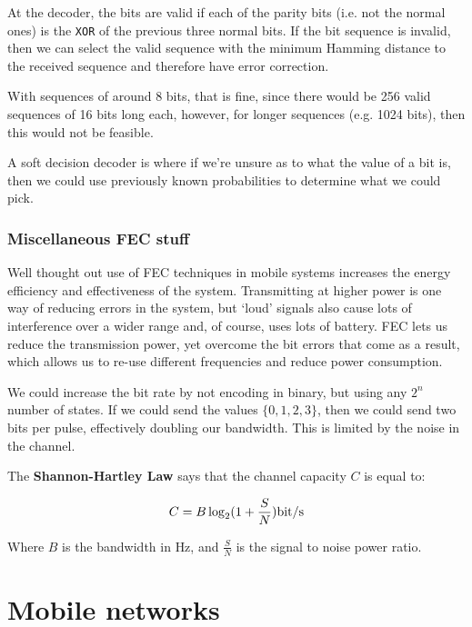 At the decoder, the bits are valid if each of the parity bits (i.e. not the
normal ones) is the \texttt{XOR} of the previous three normal bits. If the bit
sequence is invalid, then we can select the valid sequence with the minimum
Hamming distance to the received sequence and therefore have error correction.

With sequences of around 8 bits, that is fine, since there would be 256 valid
sequences of 16 bits long each, however, for longer sequences (e.g. 1024 bits),
then this would not be feasible.


A soft decision decoder is where if we're unsure as to what the value of a bit
is, then we could use previously known probabilities to determine what we could
pick.


\subsubsection{Miscellaneous FEC stuff}

Well thought out use of FEC techniques in mobile systems increases the energy
efficiency and effectiveness of the system. Transmitting at higher power is one
way of reducing errors in the system, but `loud' signals also cause lots of
interference over a wider range and, of course, uses lots of battery. FEC lets
us reduce the transmission power, yet overcome the bit errors that come as a
result, which allows us to re-use different frequencies and reduce power
consumption.

We could increase the bit rate by not encoding in binary, but using any $2^n$
number of states. If we could send the values $\{0,1,2,3\}$, then we could send
two bits per pulse, effectively doubling our bandwidth. This is limited by the
noise in the channel.

The \textbf{Shannon-Hartley Law} says that the channel capacity $C$ is equal to:

\[
  C = B \log_2(1 + \frac{S}{N}) \si{\bit\per\second}
\]

Where $B$ is the bandwidth in $\si{\hertz}$, and $\frac{S}{N}$ is the signal to
noise power ratio.


\section{Mobile networks}

